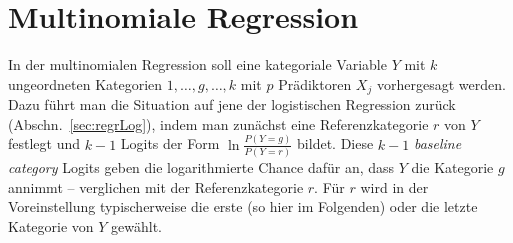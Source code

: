 \section{Multinomiale Regression}
\label{sec:regrMultinom}

In der multinomialen Regression soll eine kategoriale Variable $Y$ mit $k$ ungeordneten Kategorien $1, \dots, g, \dots, k$ mit $p$ Prädiktoren $X_{j}$ vorhergesagt werden. Dazu führt man die Situation auf jene der logistischen Regression zurück (Abschn.\ \ref{sec:regrLog}), indem man zunächst eine Referenzkategorie $r$ von $Y$ festlegt und $k-1$ Logits der Form $\ln \frac{P(Y = g)}{P(Y = r)}$ bildet. Diese $k-1$ \emph{baseline category} Logits geben die logarithmierte Chance dafür an, dass $Y$ die Kategorie $g$ annimmt -- verglichen mit der Referenzkategorie $r$. Für $r$ wird in der Voreinstellung typischerweise die erste (so hier im Folgenden) oder die letzte Kategorie von $Y$ gewählt.

